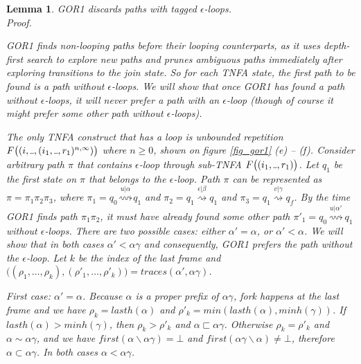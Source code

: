 \documentclass[AMA,STIX1COL]{WileyNJD-v2}
\newcommand{\Xund}{\rule{.4em}{.4pt}}
\newtheorem{XLem}{Lemma}
\begin{document}
    \begin{XLem}\label{gor1_loops}
    GOR1 discards paths with tagged $\epsilon$-loops.
    \\
    Proof.

    GOR1 finds non-looping paths before their looping counterparts,
    as it uses depth-first search to explore new paths and prunes ambiguous paths
    immediately after exploring transitions to the join state.
    So for each TNFA state, the first path to be found is a path without $\epsilon$-loops.
    We will show that once GOR1 has found a path without $\epsilon$-loops,
    it will never prefer a path with an $\epsilon$-loop
    (though of course it might prefer some other path without $\epsilon$-loops).

    The only TNFA construct that has a loop is unbounded repetition
    $F\big( (i, \Xund, (i_1, \Xund, r_1)^{n,\infty}) \big)$ where $n \geq 0$,
    shown on figure \ref{fig_gor1} (e) -- (f).
    Consider arbitrary path $\pi$ that contains
    $\epsilon$-loop through sub-TNFA $F\big( (i_1, \Xund, r_1) \big)$.
    Let $q_1$ be the first state on $\pi$ that belongs to the $\epsilon$-loop.
    Path $\pi$ can be represented as $\pi = \pi_1 \pi_2 \pi_3$, where
    $\pi_1 = q_0 \overset {u | \alpha} {\rightsquigarrow} q_1$ and
    $\pi_2 = q_1 \overset {\epsilon | \beta} {\rightsquigarrow} q_1$ and
    $\pi_3 = q_1 \overset {v | \gamma} {\rightsquigarrow} q_f$.
    By the time GOR1 finds path $\pi_1 \pi_2$,
    it must have already found some other path $\pi'_1 = q_0 \overset {u | \alpha'} {\rightsquigarrow} q_1$ without $\epsilon$-loops.
    There are two possible cases: either $\alpha' = \alpha$, or $\alpha' < \alpha$.
    We will show that in both cases $\alpha' < \alpha \gamma$
    and consequently, GOR1 prefers the path without the $\epsilon$-loop.
    Let $k$ be the index of the last frame
    and $\big( (\rho_1, \hdots, \rho_k), (\rho'_1, \hdots, \rho'_k) \big) = traces (\alpha', \alpha \gamma)$.

    First case: $\alpha' = \alpha$.
    Because $\alpha$ is a proper prefix of $\alpha \gamma$,
    fork happens at the last frame and we have
    $\rho_k = lasth(\alpha)$ and
    $\rho'_k = min (lasth(\alpha), minh(\gamma))$.
    If $lasth(\alpha) > minh(\gamma)$, then $\rho_k > \rho'_k$ and $\alpha \sqsubset \alpha \gamma$.
    Otherwise $\rho_k = \rho'_k$ and $\alpha \sim \alpha \gamma$,
    and we have $first(\alpha \backslash \alpha \gamma) = \bot$ and $first(\alpha \gamma \backslash \alpha) \neq \bot$,
    therefore $\alpha \subset \alpha \gamma$.
    In both cases $\alpha < \alpha \gamma$.


\end{XLem}
\end{document}
